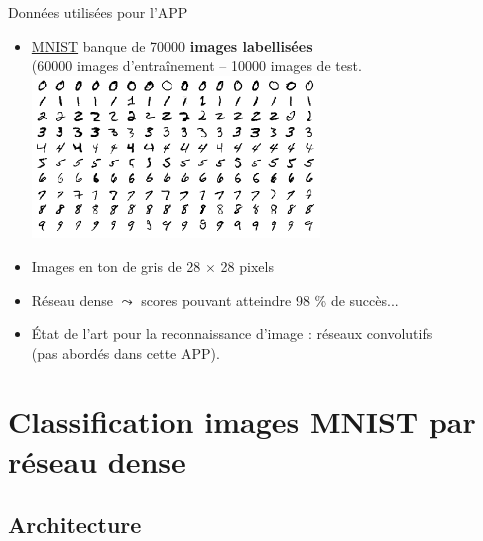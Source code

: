 \documentclass[10pt,serif,mathserif,compress,hyperref={colorlinks}]{beamer}
\begin{document}
\begin{frame}{Données utilisées pour l'APP}

  \begin{itemize}
  \item \href{http://yann.lecun.com/exdb/mnist/}{MNIST} banque de 70000 \textbf{images labellisées}\\
    (60000 images d'entraînement -- 10000 images de test.\\[3mm]
    \includegraphics[width=0.6\textwidth]{images/MNIST_digits_sample.png}
  \item Images en ton de gris de 28 $\times$ 28 pixels
  \item Réseau dense $\leadsto$ scores pouvant atteindre 98 \% de succès...
  \item État de l'art pour la reconnaissance d'image : réseaux convolutifs\\
    (pas abordés dans cette APP).
  \end{itemize}       
  
\end{frame}

\section{Classification images MNIST par réseau dense}

\subsection{Architecture}
\end{document}
